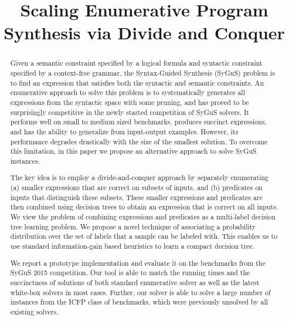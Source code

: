\documentclass{llncs}
\newcommand\arsays[1]{{\bf AR: #1}}
\begin{document}


\pagestyle{plain}
\title{Scaling Enumerative Program Synthesis via Divide and Conquer}
\author{}
\institute{}
\maketitle
\vspace*{-6ex}

\begin{abstract}
  Given a semantic constraint specified by a logical formula and
  syntactic constraint specified by a context-free grammar, the
  Syntax-Guided Synthesis (SyGuS) problem is to find an expression
  that satisfies both the syntactic and semantic constraints.
  An enumerative approach to solve this problem is to systematically
  generates all expressions from the syntactic space with some pruning,
  and has proved to be surprisingly competitive in the newly started
  competition of SyGuS solvers.  It performs well on small to medium sized
  benchmarks, produces succinct expressions, and has the ability to
  generalize from input-output examples.  However, its performance
  degrades drastically with the size of the smallest solution. To overcome
  this limitation, in this paper we propose an alternative approach to
  solve SyGuS instances.

  The key idea  is to employ a divide-and-conquer approach by
  separately enumerating (a) smaller expressions that are correct on
  subsets of inputs, and (b) predicates on inputs that distinguish these
  subsets.  These smaller expressions and predicates are then combined
  using decision trees to obtain an expression that is correct on all
  inputs.  We view the problem of combining expressions and predicates as
  a multi-label decision tree learning problem. We propose a novel
  technique of associating a probability distribution over the set of
  labels that a sample can be labeled with. This enables us to use
  standard information-gain based heuristics to learn a compact decision
  tree.

  We report a prototype implementation and evaluate it on the benchmarks
  from the SyGuS 2015 competition. Our tool is able to match the running
  times and the succinctness of solutions of both standard enumerative
  solver as well as the latest white-box solvers in most cases.  Further,
  our solver is able to solve a large number of instances from the ICFP
  class of benchmarks, which were previously unsolved by all existing
  solvers.
\end{abstract}
\end{document}
